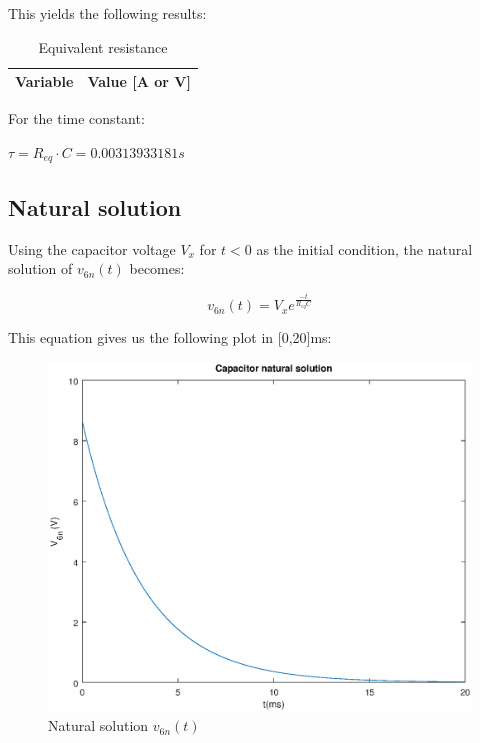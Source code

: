 This yields the following results:

\begin{table}[H]
    \centering
    \begin{tabular}{|l|r|}
      \hline    
      {\bf Variable} & {\bf Value [A or V]} \\ \hline
      
    \end{tabular}
    \caption{Equivalent resistance}
    \label{tab:equivalentresistance}
  \end{table}


For the time constant:

$\tau = R_{eq} \cdot C = 0.00313933181s$







\subsection{Natural solution}

Using the capacitor voltage $V_x$ for $t<0$ as the initial condition, the natural solution of $v_{6n}(t)$ becomes:

\begin{equation}
\label{eq:solucaonatural}
v_{6n}(t)=V_x e^{\frac{-t}{R_{eq}C}}
\end{equation}

This equation gives us the following plot in [0,20]ms:

  \begin{figure}[H] \centering
    \includegraphics[width=1\linewidth]{natural.eps}
    \caption{Natural solution $v_{6n}(t)$}
    \label{fig:natural}
    \end{figure}



